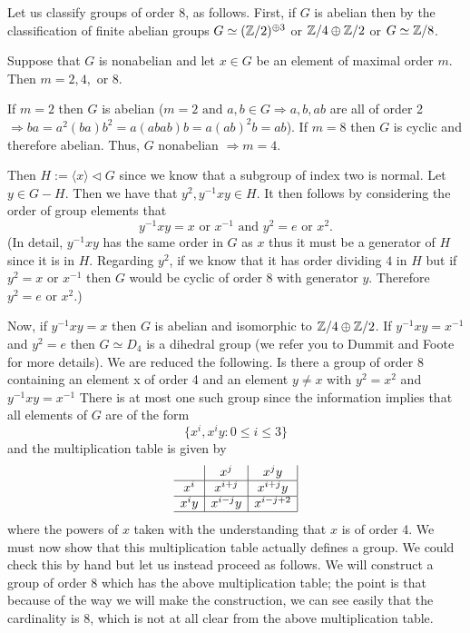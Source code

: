 \begin{eg} Let us classify groups of order 8, as follows.
    First, if $G$ is abelian then by the classification of finite abelian
    groups $G \simeq (\mathbb{Z}/2)^{\oplus 3}$ or $\mathbb{Z}/4 \oplus \mathbb{Z}/2$ or $G \simeq
    \mathbb{Z}/8$.

    Suppose that $G$ is nonabelian and let $x\in G$ be an element of maximal
    order $m$. Then $m = 2,4,$ or $8$.

    If $m=2$ then $G$ is abelian ($m=2 \text{ and } a,b\in G \Rightarrow a,b,
    ab$ are all of order 2 $\Rightarrow ba = a^2(ba)b^2 = a(abab)b = a(ab)^2b =
    ab$). If $m=8$ then $G$ is cyclic and therefore abelian. Thus, $G$
    nonabelian $\Rightarrow m=4.$

    Then $H := \langle x\rangle \vartriangleleft G$ since we know that a
    subgroup of index two is normal. Let $y\in G-H$. Then we have that $y^2,
    y^{-1}xy \in H$. It then follows by considering the order of group elements
    that \[y^{-1} x y = x \text{ or } x^{-1} \text{ and } y^2 = e \text{ or }
    x^2. \] (In detail, $y^{-1}xy$ has the same order in $G$ as $x$ thus it
    must be a generator of $H$ since it is in $H$. Regarding $y^2$, if we know
    that it has order dividing $4$ in $H$ but if $y^2 = x \text{ or } x^{-1}$
    then $G$ would be cyclic of order 8 with generator $y$. Therefore $y^2 = e
    \text{ or } x^2.$)

    Now, if $y^{-1}xy = x$ then $G$ is abelian and isomorphic to $\mathbb{Z}/4\oplus
    \mathbb{Z}/2$. If $y^{-1}x y = x^{-1}$ and $y^2 = e$ then $G\simeq D_4$ is a
    dihedral group (we refer you to Dummit and Foote for more details). We are
    reduced the following. Is there a group of order 8 containing an element x
    of order 4 and an element $y\neq x$ with $y^2 = x^2$ and $y^{-1} xy =
    x^{-1}$ There is at most one such group since the information implies that
    all elements of $G$ are of the form \[\{x^i, x^iy : 0 \le i \le 3\}\] and
    the multiplication table is given by
    \[ \begin{array}{c | c | c| }
        & x^j & x^jy \\
        \hline
        x^i & x^{i+j} & x^{i+j}y \\
        \hline
        x^iy & x^{i-j}y & x^{i-j+2} \\
        \hline
    \end{array} \]
    where the powers of $x$ taken with the understanding that $x$ is of order
    4. We must now show that this multiplication table actually defines a
    group. We could check this by hand but let us instead proceed as follows.
    We will construct a group of order 8 which has the above multiplication
    table; the point is that because of the way we will make the construction,
    we can see easily that the cardinality is 8, which is not at all clear from
    the above multiplication table.


\end{eg}
